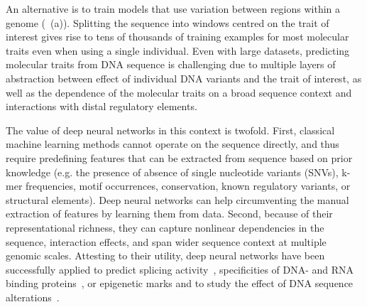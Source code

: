 An alternative is to train models that use variation between regions within a genome (~(a)). Splitting the sequence into windows centred on the trait of interest gives rise to tens of thousands of training examples for most molecular traits even when using a single individual. Even with large datasets, predicting molecular traits from DNA sequence is challenging due to multiple layers of abstraction between effect of individual DNA variants and the trait of interest, as well as the dependence of the molecular traits on a broad sequence context and interactions with distal regulatory elements.

The value of deep neural networks in this context is twofold. First, classical machine learning methods cannot operate on the sequence directly, and thus require predefining features that can be extracted from sequence based on prior knowledge (e.g. the presence of absence of single nucleotide variants (SNVs), k-mer frequencies, motif occurrences, conservation, known regulatory variants, or structural elements). Deep neural networks can help circumventing the manual extraction of features by learning them from data. Second, because of their representational richness, they can capture nonlinear dependencies in the sequence, interaction effects, and span wider sequence context at multiple genomic scales. Attesting to their utility, deep neural networks have been successfully applied to predict splicing activity~\citep{leung_deep_2014,xiong_human_2015}, specificities of DNA- and RNA binding proteins~\citep{alipanahi_predicting_2015}, or epigenetic marks and to study the effect of DNA sequence alterations~\citep{kelley_basset:_2016,zhou_predicting_2015}.

